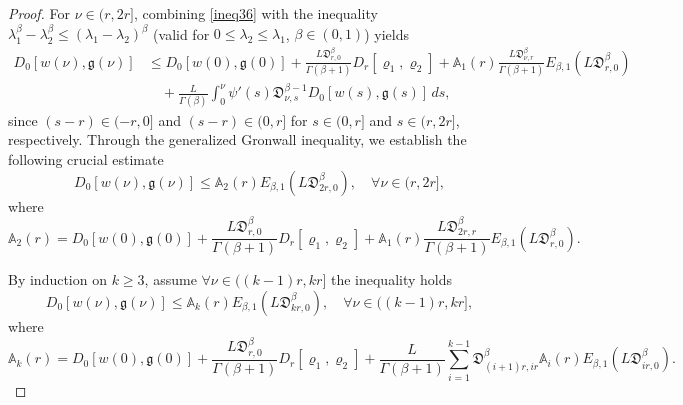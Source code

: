 \documentclass[10pt,a4paper]{amsart}
\numberwithin{equation}{section}
\begin{document}
\begin{proof}
For $\nu \in ( r, 2 r]$, combining \eqref{ineq36} with the inequality 
$\lambda_{1}^{\beta} - \lambda_{2}^{\beta} \leq (\lambda_{1} 
- \lambda_{2})^{\beta}$ (valid for $0 \leq \lambda_{2} \leq \lambda_{1}$, 
$\beta \in (0,1)$) yields
\begin{align*}
D_0[ w(\nu ), \mathfrak{g}(\nu )] 
&\leq  D_0[ w(0), \mathfrak{g}(0)]+\frac{ L\mathfrak{D}_{ r,0}^{\beta}}{\Gamma(\beta+1)}
  D_{ r}[\varrho_{1}, \varrho_{2}] +\mathbb{A}_{1}( r) 
  \frac{ L\mathfrak{D}_{\nu , r}^{\beta}}{\Gamma(\beta+1)} E_{\beta, 1}
  ( L\mathfrak{D}_{ r,0}^{\beta}) \\
&\quad +\frac{ L}{\Gamma(\beta)} \int_0^{\nu } \psi'(s)\mathfrak{D}_{\nu ,s}^{\beta-1}
 D_0[ w(s), \mathfrak{g}(s)]\,ds,
\end{align*}
since $(s- r) \in(- r, 0]$ and $(s- r) \in(0, r]$ for $s \in(0, r]$ and 
$s \in( r, 2 r]$, respectively. Through the generalized Gronwall inequality, we 
establish the following crucial estimate
\begin{equation}\label{ineq38}
D_0[ w(\nu ), \mathfrak{g}(\nu )] \leq \mathbb{A}_{2}( r)
 E_{\beta, 1}( L\mathfrak{D}_{2 r,0}^{\beta}), \quad \forall \nu \in( r, 2 r],
\end{equation}
where
\begin{equation}\label{eq39}
\mathbb{A}_{2}( r)=D_0[ w(0), \mathfrak{g}(0)]
+\frac{ L\mathfrak{D}_{ r,0}^{\beta}}{\Gamma(\beta+1)} D_{ r}[\varrho_{1}, 
\varrho_{2}]+\mathbb{A}_{1}( r) 
\frac{ L\mathfrak{D}_{2 r, r}^{\beta}}{\Gamma(\beta+1)} E_{\beta, 1}
( L\mathfrak{D}_{ r,0}^{\beta}) . 
\end{equation}

By induction on $k \geq 3$, assume $\forall \nu \in ((k-1) r, k r]$ the inequality holds
\begin{equation}\label{ineq310}
D_0[ w(\nu ), \mathfrak{g}(\nu )] \leq \mathbb{A}_{k}( r) 
E_{\beta, 1}( L\mathfrak{D}_{k r,0}^{\beta}), \quad \forall \nu \in((k-1) r, k r], 
\end{equation}
where
\begin{equation}\label{eq311}
\mathbb{A}_{k}( r)=  D_0[ w(0), \mathfrak{g}(0)]
+\frac{ L\mathfrak{D}_{ r,0}^{\beta}}{\Gamma(\beta+1)} D_{ r}[\varrho_{1}, 
\varrho_{2}] 
 +\frac{ L}{\Gamma(\beta+1)} \sum_{i=1}^{k-1}\mathfrak{D}_{(i+1) r,i r}^{\beta} 
\mathbb{A}_{i}( r) E_{\beta, 1}( L\mathfrak{D}_{i r,0}^{\beta}) . 
\end{equation}


\end{proof}
\end{document}
